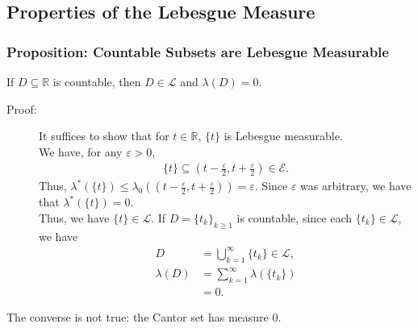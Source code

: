 \documentclass[10pt]{extarticle}
\newcommand{\R}{\mathbb{R}}
\begin{document}
  \subsection{Properties of the Lebesgue Measure}%
  \subsubsection{Proposition: Countable Subsets are Lebesgue Measurable}%
  If $D\subseteq \R$ is countable, then $D\in \mathcal{L}$ and $\lambda(D) = 0$.
  \begin{description}
    \item[Proof:] It suffices to show that for $t\in\R$, $\{t\}$ is Lebesgue measurable.\\

      We have, for any $\varepsilon > 0$,
      \begin{align*}
        \{t\}\subseteq \left(t-\frac{\varepsilon}{2},t+\frac{\varepsilon}{2}\right)\in \mathcal{E}.
      \end{align*}
      Thus, $\lambda^{\ast}(\{t\})\leq \lambda_{0}\left(\left(t-\frac{\varepsilon}{2},t+\frac{\varepsilon}{2}\right)\right) = \varepsilon$. Since $\varepsilon$ was arbitrary, we have that $\lambda^{\ast}(\{t\}) = 0$.\\

      Thus, we have $\{t\}\in\mathcal{L}$. If $D = \{t_k\}_{k\geq 1}$ is countable, since each $\{t_k\}\in\mathcal{L}$, we have
      \begin{align*}
        D &= \bigcup_{k=1}^{\infty}\{t_k\}\in \mathcal{L},\\
        \lambda(D) &= \sum_{k=1}^{\infty}\lambda(\{t_k\})\\
                   &= 0.
      \end{align*}
  \end{description}
  The converse is not true: the Cantor set has measure $0$.
\end{document}
